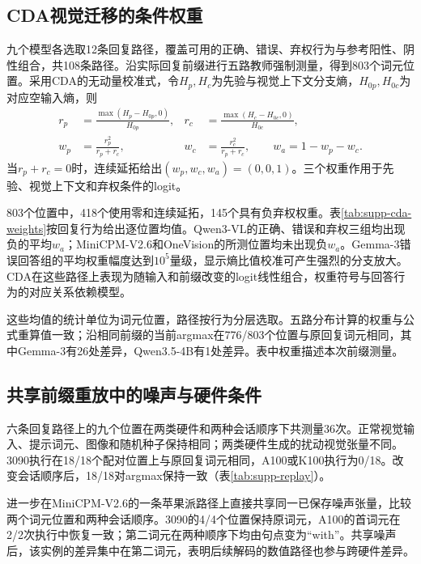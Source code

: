 


\subsection{CDA视觉迁移的条件权重}
\label{sec:supp-cda-weights}

九个模型各选取12条回复路径，覆盖可用的正确、错误、弃权行为与参考阳性、阴性组合，共108条路径。沿实际回复前缀进行五路教师强制测量，得到803个词元位置。采用CDA的无动量校准式\cite{kim2025cda}，令$H_p,H_c$为先验与视觉上下文分支熵，$H_{0p},H_{0c}$为对应空输入熵，则
\begin{align}
 r_p&=\frac{\max(H_p-H_{0p},0)}{H_{0p}},&
 r_c&=\frac{\max(H_c-H_{0c},0)}{H_{0c}},\\
 w_p&=\frac{r_p^2}{r_p+r_c},&
 w_c&=\frac{r_c^2}{r_p+r_c},\qquad w_a=1-w_p-w_c.
\end{align}
当$r_p+r_c=0$时，连续延拓给出$(w_p,w_c,w_a)=(0,0,1)$。三个权重作用于先验、视觉上下文和弃权条件的logit。

803个位置中，418个使用零和连续延拓，145个具有负弃权权重。表\ref{tab:supp-cda-weights}按回复行为给出逐位置均值。Qwen3-VL的正确、错误和弃权三组均出现负的平均$w_a$；MiniCPM-V2.6和OneVision的所测位置均未出现负$w_a$。Gemma-3错误回答组的平均权重幅度达到$10^5$量级，显示熵比值校准可产生强烈的分支放大。CDA在这些路径上表现为随输入和前缀改变的logit线性组合，权重符号与回答行为的对应关系依赖模型。



这些均值的统计单位为词元位置，路径按行为分层选取。五路分布计算的权重与公式重算值一致；沿相同前缀的当前argmax在776/803个位置与原回复词元相同，其中Gemma-3有26处差异，Qwen3.5-4B有1处差异。表中权重描述本次前缀测量。

\subsection{共享前缀重放中的噪声与硬件条件}
\label{sec:supp-replay-conditions}

六条回复路径上的九个位置在两类硬件和两种会话顺序下共测量36次。正常视觉输入、提示词元、图像和随机种子保持相同；两类硬件生成的扰动视觉张量不同。3090执行在18/18个配对位置上与原回复词元相同，A100或K100执行为0/18。改变会话顺序后，18/18对argmax保持一致（表\ref{tab:supp-replay}）。

进一步在MiniCPM-V2.6的一条苹果派路径上直接共享同一已保存噪声张量，比较两个词元位置和两种会话顺序。3090的4/4个位置保持原词元，A100的首词元在2/2次执行中恢复一致；第二词元在两种顺序下均由句点变为``with''。共享噪声后，该实例的差异集中在第二词元，表明后续解码的数值路径也参与跨硬件差异。


